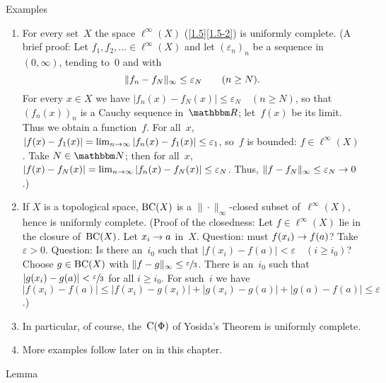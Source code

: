 \documentclass[main.tex]{subfiles}
\begin{document}
\begin{psec}{4.6}{Examples}
\begin{enumerate}
\item \label{4.6-1}
For every set~$X$
the space $\ell^\infty(X)$ (\ref{1.5}\ref{1.5-2})
is uniformly complete.
(A brief proof:
Let $f_1,f_2,\dotsc\in \ell^\infty(X)$
and let $(\varepsilon_n)_n$ be a sequence in~$(0,\infty)$,
tending to~$0$ and with
\begin{equation*}
\|f_n-f_N\|_\infty \leq \varepsilon_N \qquad (n\geq N)\text{.}
\end{equation*}
For every $x\in X$ we have $|f_n(x)-f_N(x)|\leq\varepsilon_N\quad (n\geq N)$,
so that $(f_n(x))_n$ is a Cauchy sequence in~$\R$;
let~$f(x)$ be its limit.
Thus we obtain a function~$f$.
For all~$x$,
$|f(x)-f_1(x)|=\lim_{n\rightarrow \infty} |f_n(x)-f_1(x)|\leq \varepsilon_1$,
so~$f$ is bounded: $f\in \ell^\infty(X)$.
Take $N\in\N$;
then for all~$x$,
$|f(x)-f_N(x)|
=\lim_{n\rightarrow\infty}|f_n(x)-f_N(x)|
\leq\varepsilon_N$.
Thus, $\| f-f_N \|_\infty \leq \varepsilon_N \rightarrow 0$.)
%
\item \label{4.6-2}
If $X$ is a topological space,
$\mathrm{BC}(X)$ is a $\|\cdot\|_\infty$-closed subset of~$\ell^\infty(X)$,
hence is uniformly complete.
(Proof of the closedness:
Let $f\in \ell^\infty(X)$ lie in the closure of~$\mathrm{BC}(X)$.
Let $x_i\rightarrow a$ in~$X$.
Question:
must $f(x_i)\rightarrow f(a)$?
Take $\varepsilon>0$.
Question:
Is there an~$i_0$
such that $|f(x_i)-f(a)|<\varepsilon\quad(i\geq i_0)$?
Choose $g\in\mathrm{BC}(X)$ 
with $\|f-g\|_\infty\leq \sfrac{\varepsilon}{3}$.
There is an~$i_0$ such that $|g(x_i)-g(a)|<\sfrac{\varepsilon}{3}$
for all $i\geq i_0$.
For such~$i$ we have
$|f(x_i)-f(a)|
\leq|f(x_i)-g(x_i)| + |g(x_i)-g(a)| + |g(a)-f(a)|
\leq \varepsilon$.)
%
\item \label{4.6-3}
In particular,
of course,
the~$\mathrm{C}(\Phi)$ of Yosida's Theorem is uniformly complete.
%
\item \label{4.6-4}
More examples follow later on in this chapter.
\end{enumerate}
\end{psec}
%
%
\begin{psec}{4.7}{Lemma}
\end{psec}
\end{document}
